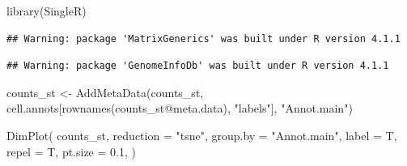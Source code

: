 \documentclass[
]{book}
\newenvironment{Shaded}{\begin{snugshade}}{\end{snugshade}}
\newcommand{\AttributeTok}[1]{\textcolor[rgb]{0.77,0.63,0.00}{#1}}
\newcommand{\FloatTok}[1]{\textcolor[rgb]{0.00,0.00,0.81}{#1}}
\newcommand{\FunctionTok}[1]{\textcolor[rgb]{0.00,0.00,0.00}{#1}}
\newcommand{\NormalTok}[1]{#1}
\newcommand{\OtherTok}[1]{\textcolor[rgb]{0.56,0.35,0.01}{#1}}
\newcommand{\SpecialCharTok}[1]{\textcolor[rgb]{0.00,0.00,0.00}{#1}}
\newcommand{\StringTok}[1]{\textcolor[rgb]{0.31,0.60,0.02}{#1}}
\begin{document}
\begin{Shaded}
\begin{Highlighting}[]
\FunctionTok{library}\NormalTok{(SingleR)}
\end{Highlighting}
\end{Shaded}

\begin{verbatim}
## Warning: package 'MatrixGenerics' was built under R version 4.1.1
\end{verbatim}

\begin{verbatim}
## Warning: package 'GenomeInfoDb' was built under R version 4.1.1
\end{verbatim}

\begin{Shaded}
\end{Shaded}

\begin{Shaded}
\begin{Highlighting}[]
\NormalTok{counts\_st }\OtherTok{\textless{}{-}}
  \FunctionTok{AddMetaData}\NormalTok{(counts\_st, cell.annots[}\FunctionTok{rownames}\NormalTok{(counts\_st}\SpecialCharTok{@}\NormalTok{meta.data), }\StringTok{"labels"}\NormalTok{], }\StringTok{"Annot.main"}\NormalTok{)}
\end{Highlighting}
\end{Shaded}

\begin{Shaded}
\begin{Highlighting}[]
\FunctionTok{DimPlot}\NormalTok{(}
\NormalTok{    counts\_st,}
    \AttributeTok{reduction =} \StringTok{"tsne"}\NormalTok{,}
    \AttributeTok{group.by =} \StringTok{"Annot.main"}\NormalTok{,}
    \AttributeTok{label =}\NormalTok{ T,}
    \AttributeTok{repel =}\NormalTok{ T,}
    \AttributeTok{pt.size =} \FloatTok{0.1}\NormalTok{,}
\NormalTok{  )}
\end{Highlighting}
\end{Shaded}
\end{document}

